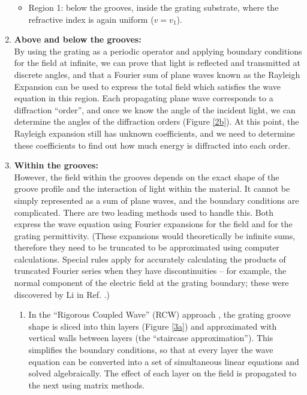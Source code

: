 \begin{enumerate}
\begin{itemize}
	\item Region 1: below the grooves, inside the grating substrate, where the refractive index is again uniform ($v=v_1$).
	\end{itemize}
\item \textbf{Above and below the grooves:}\\
By using the grating as a periodic operator and applying boundary conditions for the field at infinite, we can prove that light is reflected and transmitted at discrete angles, and that a Fourier sum of plane waves known as the Rayleigh Expansion can be used to express the total field which satisfies the wave equation in this region.  Each propagating plane wave corresponds to a diffraction ``order'', and once we know the angle of the incident light, we can determine the angles of the diffraction orders (Figure \ref{2b}).  At this point, the Rayleigh expansion still has unknown coefficients, and we need to determine these coefficients to find out how much energy is diffracted into each order.
\item \textbf{Within the grooves:}\\
However, the field within the grooves depends on the exact shape of the groove profile and the interaction of light within the material.  It cannot be simply represented as a sum of plane waves, and the boundary conditions are complicated.  There are two leading methods used to handle this.  Both express the wave equation using Fourier expansions for the field and for the grating permittivity.  (These expansions would theoretically be infinite sums, therefore they need to be truncated to be approximated using computer calculations.  Special rules apply for accurately calculating the products  of truncated Fourier series when they have discontinuities -- for example, the normal component of the electric field at the grating boundary; these were discovered by Li in Ref. \cite{Li96b}.)
\begin{enumerate} 
	\item In the ``Rigorous Coupled Wave'' (RCW) approach \cite{Moh95}, the grating groove shape is sliced into thin layers (Figure \ref{3a}) and approximated with vertical walls between layers (the ``staircase approximation'').  This simplifies the boundary conditions, so that at every layer the wave equation can be converted into a set of simultaneous linear equations and solved algebraically.  The effect of each layer on the field is propagated to the next using matrix methods.
	

\end{enumerate}
\end{enumerate}
